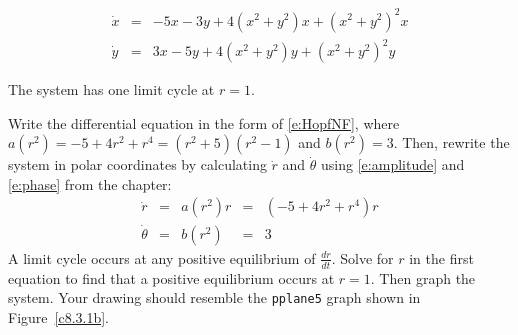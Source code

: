 \documentclass{ximera}
\begin{document}
\begin{exercise} \label{c8.3.1b}
\[ 
\begin{array}{rcl}
\dot{x} & = &  -5x-3y + 4(x^2+y^2)x + (x^2+y^2)^2x\\
\dot{y} & = &  3x-5y + 4(x^2+y^2)y + (x^2+y^2)^2y
\end{array}
\]

\begin{solution}

\ans The system has one limit cycle at $r = 1$.

\soln Write the differential equation in the form of \eqref{e:HopfNF},
where $a(r^2) = -5 + 4r^2 + r^4=(r^2+5)(r^2-1)$ and $b(r^2) = 3$.  Then,
rewrite the system in polar coordinates by calculating $\dot{r}$ and
$\dot{\theta}$ using \eqref{e:amplitude} and \eqref{e:phase} from the
chapter:
\[ 
\begin{array}{rcccl}
\dot{r} & = & a(r^2)r & = & (-5 + 4r^2 + r^4)r \\
\dot{\theta} & = & b(r^2) & = & 3 \end{array}
\]
A limit cycle occurs at any positive equilibrium of $\frac{dr}{dt}$.
Solve for $r$ in the first equation to find that a positive equilibrium 
occurs at $r = 1$.  Then graph the system.  Your drawing should resemble the 
{\tt pplane5} graph shown in Figure~\ref{c8.3.1b}.

\begin{figure}[htb]
                       \centerline{%
                       }
\end{figure}


\end{solution}
\end{exercise}
\end{document}
